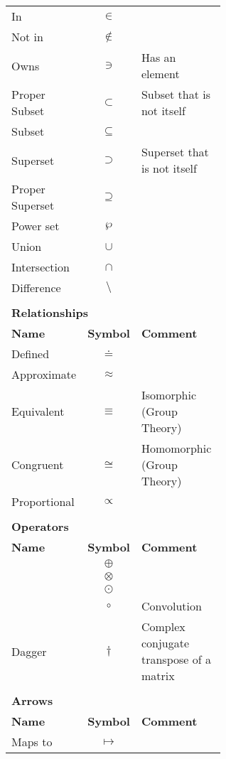 \documentclass[12pt, english]{book}
\theoremstyle{break}
\theoremstyle{plain}
\begin{document}
\begin{tabularx}{\textwidth}{ l c p{0.6\linewidth}}
 		In 						& $\in$ 			& \\
 		Not in 					& $\nin$			& \\
 		Owns 					& $\ni$				& Has an element \\
 		
 		Proper Subset 			& $\subset$			& Subset that is not itself \\
 		Subset 					& $\subseteq$		& \\
 		Superset 				& $\supset$ 		& Superset that is not itself\\
 		Proper Superset 		& $\supseteq$		& \\
 		Power set				& $\wp$				& \\
 		Union 					& $\cup$			& \\
 		Intersection			& $\cap$			& \\
 		Difference				& $\setminus$		& \\
 		\hline
 		
 		& & \\
 		\multicolumn{3}{l}{\textbf{{\large Relationships}}} \\ [10pt]
 		\hline
 		\textbf{Name} & \textbf{Symbol} & \textbf{Comment} \\
 		\hline
 		Defined 				& $\doteq$ 			& \\
 		Approximate 			& $\approx$			& \\
 		Equivalent				& $\equiv$	 		& Isomorphic (Group Theory) \\
 		Congruent 				& $\cong$			& Homomorphic (Group Theory) \\
 		Proportional 			& $\propto$			& \\
 		\hline
 		
 		& & \\
 		\multicolumn{3}{l}{\textbf{{\large Operators}}} \\ [10pt]
 		\hline
 		\textbf{Name} & \textbf{Symbol} & \textbf{Comment} \\
 		\hline
 		& $\oplus$ & \\
 		& $\otimes$ & \\
 		& $\odot$ & \\
 		& $\circ$ & Convolution \\
 		Dagger& $\dagger$ & Complex conjugate transpose of a matrix \\
 		\hline
 		
 		& & \\
 		\multicolumn{3}{l}{\textbf{{\large Arrows}}} \\ [10pt]
 		\hline
 		\textbf{Name} & \textbf{Symbol} & \textbf{Comment} \\
 		\hline
 		Maps to 				& $\mapsto$			& \\
 		\hline
 		

\end{tabularx}
\end{document}
